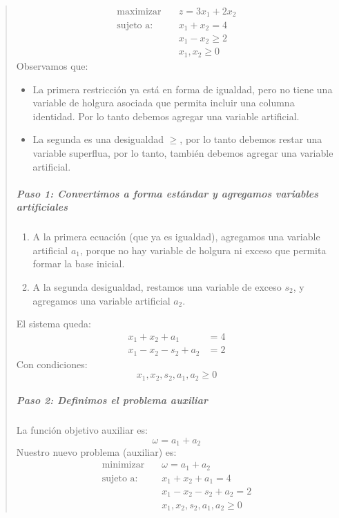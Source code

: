 \begin{quote}
  \begin{align*}
    \text{maximizar} \quad  &z = 3x_1 + 2x_2\\[3pt]
    \text{sujeto a:} \quad  &x_1 + x_2 = 4\\
                            &x_1 - x_2 \geq 2\\
                            &x_1, x_2 \geq 0
  \end{align*}
  Observamos que:
  \begin{itemize}
    \item La primera restricción ya está en forma de igualdad, pero no tiene una variable de holgura asociada que permita incluir una columna identidad. Por lo tanto debemos agregar una variable artificial.
    \item La segunda es una desigualdad \(\geq\), por lo tanto debemos restar una variable superflua, por lo tanto, también debemos agregar una variable artificial.
  \end{itemize}
  
  \subparagraph{Paso 1: Convertimos a forma estándar y agregamos variables artificiales}
  \begin{enumerate}
    \item A la primera ecuación (que ya es igualdad), agregamos una variable artificial \(a_1\), porque no hay variable de holgura ni exceso que permita formar la base inicial.
    \item A la segunda desigualdad, restamos una variable de exceso \(s_2\), y agregamos una variable artificial \(a_2\).
  \end{enumerate}
  El sistema queda:
  \begin{align*}
    x_1 + x_2 + a_1 &= 4\\
    x_1 - x_2 - s_2 + a_2 &= 2
  \end{align*}  
  Con condiciones:
  \[
    x_1, x_2, s_2, a_1, a_2 \geq 0
  \]

  \subparagraph{Paso 2: Definimos el problema auxiliar}
  
  La función objetivo auxiliar es:
  \[
    \omega = a_1 + a_2
  \]
  Nuestro nuevo problema (auxiliar) es:
  \begin{align*}
    \text{minimizar} \quad  &\omega = a_1 + a_2\\[3pt]
    \text{sujeto a:} \quad  &x_1 + x_2 + a_1 = 4\\
                            &x_1 - x_2 - s_2 + a_2 = 2\\
                            &x_1, x_2, s_2, a_1, a_2 \geq 0
  \end{align*}


\end{quote}
